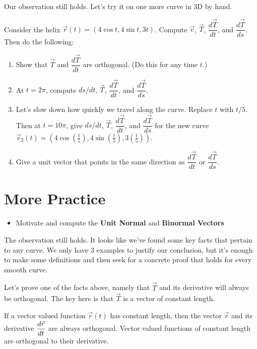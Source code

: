 Our observation still holds.  Let's try it on one more curve in 3D by hand.
\begin{problem}
 Consider the helix $\vec r(t)=(4\cos t,4\sin t, 3t)$.  Compute $\vec v$, $\vec T$, $\dfrac{d\vec T}{dt}$, and $\dfrac{d\vec T}{ds}$. Then do the following:
\begin{enumerate}
 \item Show that $\vec T$ and $\dfrac{d\vec T}{dt}$ are orthogonal. (Do this for any time $t$.)
\item At $t=2\pi$, compute $ds/dt$, $\vec T$, $\dfrac{d\vec T}{dt}$, and $\dfrac{d\vec T}{ds}$.
 \item Let's slow down how quickly we travel along the curve.  Replace $t$ with $t/5$.  Then at $t=10\pi$, give $ds/dt$, $\vec T$, $\dfrac{d\vec T}{dt}$, and $\dfrac{d\vec T}{ds}$ for the new curve $\vec r_2(t) =(4\cos(\frac{t}{5}),4\sin(\frac{t}{5}), 3(\frac{t}{5}))$.
 \item Give a unit vector that points in the same direction as $\dfrac{d\vec T}{dt}$ or $\dfrac{d\vec T}{ds}$.
\end{enumerate}

\end{problem}


\section{More Practice}

\begin{itemize}
\item Motivate and compute the \textbf{Unit Normal} and \textbf{Binormal Vectors} 
\end{itemize}
\vskip0.2in

The observation still holds. It looks like we've found some key facts that pertain to any curve.  We only have 3 examples to justify our conclusion, but it's enough to make some definitions and then seek for a concrete proof that holds for every smooth curve.

Let's prove one of the facts above, namely that $\vec T$ and its derivative will always be orthogonal.  The key here is that $\vec T$ is a vector of constant length.
\begin{theorem}\label{vector valued functions of constant length}
 If a vector valued function $\vec r(t)$ has constant length, then the vector $\vec r$ and its derivative $\displaystyle\frac{d\vec r}{dt}$ are always orthogonal. Vector valued functions of constant length are orthogonal to their derivative.  
\end{theorem}

